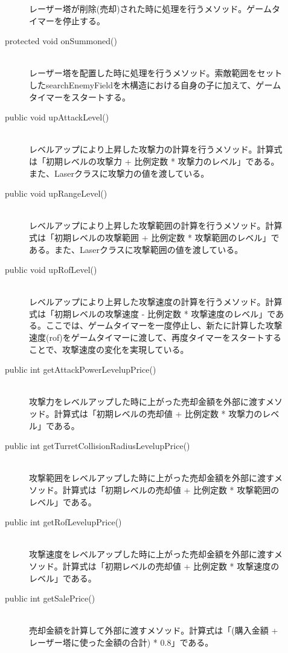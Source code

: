 \documentclass[11pt,a4j]{jarticle}
\begin{document}
\begin{description}
\begin{description}
                    レーザー塔が削除(売却)された時に処理を行うメソッド。ゲームタイマーを停止する。
              \item[protected void onSummoned()]\mbox{}\\
                    レーザー塔を配置した時に処理を行うメソッド。索敵範囲をセットしたsearchEnemyFieldを木構造における自身の子に加えて、ゲームタイマーをスタートする。
              \item[public void upAttackLevel()]\mbox{}\\
                    レベルアップにより上昇した攻撃力の計算を行うメソッド。計算式は「初期レベルの攻撃力 + 比例定数 * 攻撃力のレベル」である。また、Laserクラスに攻撃力の値を渡している。
              \item[public void upRangeLevel()]\mbox{}\\
                    レベルアップにより上昇した攻撃範囲の計算を行うメソッド。計算式は「初期レベルの攻撃範囲 + 比例定数 * 攻撃範囲のレベル」である。また、Laserクラスに攻撃範囲の値を渡している。
              \item[public void upRofLevel()] \mbox{}\\
                    レベルアップにより上昇した攻撃速度の計算を行うメソッド。計算式は「初期レベルの攻撃速度 - 比例定数 * 攻撃速度のレベル」である。ここでは、ゲームタイマーを一度停止し、新たに計算した攻撃速度(rof)をゲームタイマーに渡して、再度タイマーをスタートすることで、攻撃速度の変化を実現している。
              \item[public int getAttackPowerLevelupPrice()] \mbox{}\\
                    攻撃力をレベルアップした時に上がった売却金額を外部に渡すメソッド。計算式は「初期レベルの売却値 + 比例定数 * 攻撃力のレベル」である。
              \item[public int getTurretCollisionRadiusLevelupPrice()] \mbox{}\\
                    攻撃範囲をレベルアップした時に上がった売却金額を外部に渡すメソッド。計算式は「初期レベルの売却値 + 比例定数 * 攻撃範囲のレベル」である。
              \item[public int getRofLevelupPrice()] \mbox{}\\
                    攻撃速度をレベルアップした時に上がった売却金額を外部に渡すメソッド。計算式は「初期レベルの売却値 + 比例定数 * 攻撃速度のレベル」である。
              \item[public int getSalePrice()] \mbox{}\\
                    売却金額を計算して外部に渡すメソッド。計算式は「(購入金額 + レーザー塔に使った金額の合計) * 0.8」である。

\end{description}
\end{description}
\end{document}
